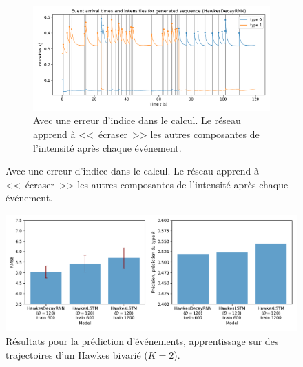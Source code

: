 \documentclass{beamer}
\begin{document}
\begin{frame}
\begin{figure}\ContinuedFloat
\begin{subfigure}{\linewidth}
	\includegraphics[width=\linewidth]{../results/intensity_HawkesDecayRNN_2d_hidden64_20181209-003122_OLD.pdf}
	\caption{Avec une erreur d'indice dans le calcul. Le réseau apprend à <<~écraser~>> les autres composantes de l'intensité après chaque événement.}
\end{subfigure}
\end{figure}
\end{frame}

\begin{frame}
\begin{figure}
	\centering
	\includegraphics[width=\linewidth]{../results/2D_Hawkes_Data_RMSE_20181209-181315.pdf}
	\caption{Résultats pour la prédiction d'événements, apprentissage sur des trajectoires d'un Hawkes bivarié ($K=2$).}
\end{figure}
\end{frame}
\end{document}
